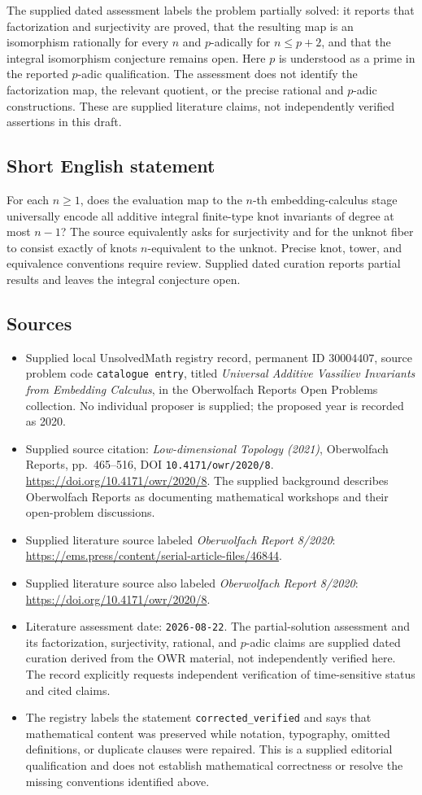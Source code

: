 \documentclass[11pt]{article}
\begin{document}
The supplied dated assessment labels the problem partially solved: it reports that factorization and surjectivity are proved, that the resulting map is an isomorphism rationally for every \(n\) and \(p\)-adically for \(n\leq p+2\), and that the integral isomorphism conjecture remains open. Here \(p\) is understood as a prime in the reported \(p\)-adic qualification. The assessment does not identify the factorization map, the relevant quotient, or the precise rational and \(p\)-adic constructions. These are supplied literature claims, not independently verified assertions in this draft.
\subsection{Short English statement}
For each \(n\geq1\), does the evaluation map to the \(n\)-th embedding-calculus stage universally encode all additive integral finite-type knot invariants of degree at most \(n-1\)? The source equivalently asks for surjectivity and for the unknot fiber to consist exactly of knots \(n\)-equivalent to the unknot. Precise knot, tower, and equivalence conventions require review. Supplied dated curation reports partial results and leaves the integral conjecture open.
\subsection{Sources}
\begin{itemize}
\item Supplied local UnsolvedMath registry record, permanent ID \(30004407\), source problem code \texttt{catalogue entry}, titled \emph{Universal Additive Vassiliev Invariants from Embedding Calculus}, in the Oberwolfach Reports Open Problems collection. No individual proposer is supplied; the proposed year is recorded as 2020.
\item Supplied source citation: \emph{Low-dimensional Topology (2021)}, Oberwolfach Reports, pp.\ 465--516, DOI \texttt{10.4171/owr/2020/8}. \url{https://doi.org/10.4171/owr/2020/8}. The supplied background describes Oberwolfach Reports as documenting mathematical workshops and their open-problem discussions.
\item Supplied literature source labeled \emph{Oberwolfach Report 8/2020}: \url{https://ems.press/content/serial-article-files/46844}.
\item Supplied literature source also labeled \emph{Oberwolfach Report 8/2020}: \url{https://doi.org/10.4171/owr/2020/8}.
\item Literature assessment date: \texttt{2026-08-22}. The partial-solution assessment and its factorization, surjectivity, rational, and \(p\)-adic claims are supplied dated curation derived from the OWR material, not independently verified here. The record explicitly requests independent verification of time-sensitive status and cited claims.
\item The registry labels the statement \texttt{corrected\_verified} and says that mathematical content was preserved while notation, typography, omitted definitions, or duplicate clauses were repaired. This is a supplied editorial qualification and does not establish mathematical correctness or resolve the missing conventions identified above.
\end{itemize}
\end{document}
